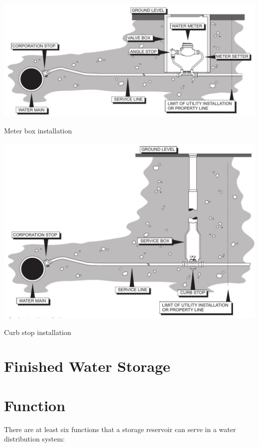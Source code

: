 \documentclass[10pt]{article}
\begin{document}
\includegraphics[max width=\textwidth]{MeterBoxInstallation}

Meter box installation

\includegraphics[max width=\textwidth]{CurbStopInstallation}

Curb stop installation

\section{Finished Water Storage}
\section{Function}
There are at least six functions that a storage reservoir can serve in a water distribution system:
\end{document}
